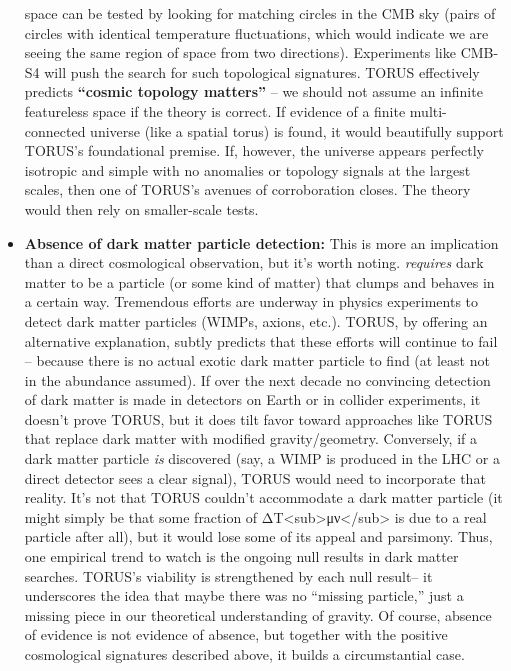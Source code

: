 \documentclass[
]{article}
\begin{document}
\begin{itemize}
  space can be tested by looking for matching circles in the CMB sky
  (pairs of circles with identical temperature fluctuations, which would
  indicate we are seeing the same region of space from two directions).
  Experiments like CMB-S4 will push the search for such topological
  signatures\hspace{0pt}. TORUS effectively predicts \textbf{``cosmic
  topology matters''} -- we should not assume an infinite featureless
  space if the theory is correct. If evidence of a finite
  multi-connected universe (like a spatial torus) is found, it would
  beautifully support TORUS's foundational premise. If, however, the
  universe appears perfectly isotropic and simple with no anomalies or
  topology signals at the largest scales, then one of TORUS's avenues of
  corroboration closes. The theory would then rely on smaller-scale
  tests.
\item
  \textbf{Absence of dark matter particle detection:} This is more an
  implication than a direct cosmological observation, but it's worth
  noting. \LambdaCDM \emph{requires} dark matter to be a particle (or some
  kind of matter) that clumps and behaves in a certain way. Tremendous
  efforts are underway in physics experiments to detect dark matter
  particles (WIMPs, axions, etc.). TORUS, by offering an alternative
  explanation, subtly predicts that these efforts will continue to fail
  -- because there is no actual exotic dark matter particle to find (at
  least not in the abundance assumed). If over the next decade no
  convincing detection of dark matter is made in detectors on Earth or
  in collider experiments, it doesn't prove TORUS, but it does tilt
  favor toward approaches like TORUS that replace dark matter with
  modified gravity/geometry. Conversely, if a dark matter particle
  \emph{is} discovered (say, a WIMP is produced in the LHC or a direct
  detector sees a clear signal), TORUS would need to incorporate that
  reality. It's not that TORUS couldn't accommodate a dark matter
  particle (it might simply be that some fraction of
  ΔT\textless sub\textgreater μν\textless/sub\textgreater{} is due to a
  real particle after all), but it would lose some of its appeal and
  parsimony. Thus, one empirical trend to watch is the ongoing null
  results in dark matter searches. TORUS's viability is strengthened by
  each null result\hspace{0pt}-- it underscores the idea that maybe
  there was no ``missing particle,'' just a missing piece in our
  theoretical understanding of gravity. Of course, absence of evidence
  is not evidence of absence, but together with the positive
  cosmological signatures described above, it builds a circumstantial
  case.
\end{itemize}
\end{document}
